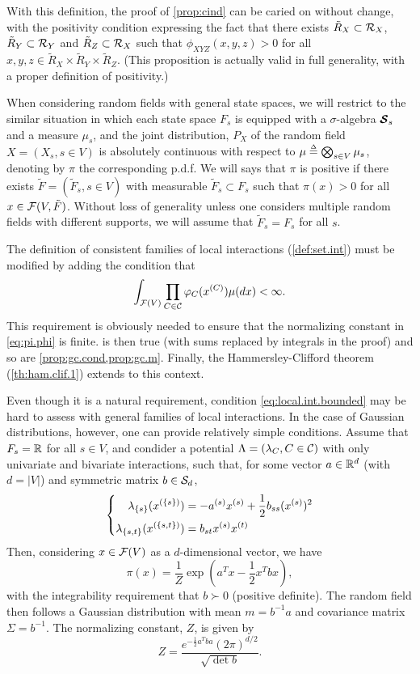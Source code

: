 With this definition, the proof of \cref{prop:cind} can be caried on without change, with the positivity condition expressing the fact that there exists $\tilde R_X \subset {\mathcal R}_X$, $\tilde R_Y \subset {\mathcal R}_Y$ and $\tilde R_Z \subset {\mathcal R}_X$ such that $\phi_{XYZ}(x,y,z) > 0$ for all $x,y,z\in \tilde R_X \times \tilde R_Y \times \tilde R_Z$. (This proposition is actually valid in full generality, with a proper definition of positivity.)


When considering random fields with general state spaces, we will restrict to the similar situation in which each state space $F_s$ is equipped with a $\sigma$-algebra $\bm{{\mathcal S}}_s$ and a measure $\mu_s$, and the joint distribution, $P_X$ of the random field $X  = (X_s, s\in V)$  is absolutely continuous with respect to $\mu\stackrel{{\scriptscriptstyle \Delta}}{=} \bigotimes_{s\in V} \mu_s$, denoting by $\pi$ the corresponding p.d.f. We will says that $\pi$ is positive if there exists $\tilde F = (\tilde F_s, s\in V)$ with measurable $\tilde F_s \subset F_s$ such that $\pi(x) > 0$ for all $x\in {\mathcal F}(V, \tilde F)$. Without loss of generality unless one considers multiple random fields with different supports, we will assume that $\tilde F_s = F_s$ for all $s$.


The definition of consistent families of local interactions (\cref{def:set.int}) must be modified by adding the condition that
\begin{equation}
\label{eq:local.int.bounded}
\int_{{\mathcal F}(V)} \prod_{C\in {\mathcal C}}\varphi_C(x^{(C)}) \mu(dx) < \infty.
\end{equation}
This requirement is obviously needed to ensure that the normalizing constant in \cref{eq:pi.phi} is finite.  is then true (with sums replaced by integrals in the proof) and so are \cref{prop:gc.cond,prop:gc.m}. Finally, the Hammersley-Clifford theorem (\cref{th:ham.clif.1}) extends to this context.

Even though it is a natural requirement, condition \eqref{eq:local.int.bounded} may be hard to assess with general families of local interactions. In the case of Gaussian distributions, however, one can provide relatively simple conditions. Assume that $F_s = {\mathbb{R}}$ for all $s\in V$, and condider a potential $\Lambda = (\lambda_C, C\in {\mathcal C})$ with only univariate and bivariate interactions, such that, for some vector $a\in {\mathbb{R}}^d$ (with $d = |V|$) and symmetric matrix $b \in {\mathcal S}_d$,
\[
\left\{
\begin{aligned}
\lambda_{\{s\}}(x^{(\{s\})}) &= -a^{(s)} x^{(s)} + \frac12 b_{ss} (x^{(s)})^2\\
\lambda_{\{s,t\}}(x^{(\{s,t\})}) &=  b_{st} x^{(s)}x^{(t)}
\end{aligned}
\right.
\]
Then, considering $x\in {\mathcal F}(V)$ as a $d$-dimensional vector, we have
\[
\pi(x) = \frac{1}{Z} \exp\left(a^T x - \frac12 x^T b x\right),
\]
with the integrability requirement that $b \succ 0$ (positive definite). The random field then follows a Gaussian distribution with mean $m = b^{-1} a$ and covariance matrix $\Sigma = b^{-1}$. The normalizing constant, $Z$, is given by
\[
Z = \frac{e^{-\frac12 a^Tba}(2\pi)^{d/2}}{\sqrt{\det{b}}}.
\]


